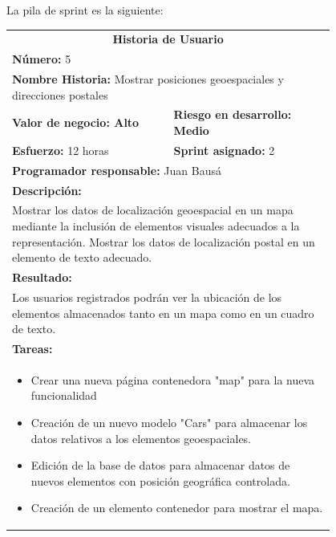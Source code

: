 	La pila de sprint es la siguiente:
	
	\begin{table}[H]
	  \centering 
	 	\begin{tabular}{p{0.4\linewidth}p{0.4\linewidth}}
	    \toprule
	    \multicolumn{2}{c}{\cellcolor{black!30}\textbf{Historia de Usuario}} 													\\
		\multicolumn{2}{l}{\cellcolor{gray!25}\textbf{Número: }5}																\\
		\multicolumn{2}{l}{\textbf{Nombre Historia: } Mostrar posiciones geoespaciales y direcciones postales}				\\
		\cellcolor{gray!25}\textbf{Valor de negocio: Alto}	&	\cellcolor{gray!25}\textbf{Riesgo en desarrollo: Medio}		\\
		\textbf{Esfuerzo:} 12 horas				&	\textbf{Sprint asignado: }2 												\\
		\multicolumn{2}{l}{\cellcolor{gray!25}\textbf{Programador responsable: }Juan Bausá}									\\
		\multicolumn{2}{l}{\textbf{Descripción:}}                                                     						\\
		\multicolumn{2}{l}{\parbox{15cm}{Mostrar los datos de localización geoespacial en un mapa mediante la inclusión de elementos visuales adecuados a la representación. Mostrar los datos de localización postal en un elemento de texto adecuado.}}				\\
		\multicolumn{2}{l}{\cellcolor{gray!25}\textbf{Resultado:}}																\\		
		\multicolumn{2}{l}{\parbox{15cm}{Los usuarios registrados podrán ver la ubicación de los elementos almacenados tanto en un mapa como en un cuadro de texto.}}																									\\
		\multicolumn{2}{l}{\textbf{Tareas:}}																					\\
		\multicolumn{2}{l}{
			\begin{minipage}{12cm}
	    		\vskip 4pt
	    		\begin{itemize}
	    			\item Crear una nueva página contenedora "map" para la nueva funcionalidad
	    			\item Creación de un nuevo modelo "Cars" para almacenar los datos relativos a los elementos geoespaciales.
	    			\item Edición de la base de datos para almacenar datos de nuevos elementos con posición geográfica controlada.
	    			\item Creación de un elemento contenedor para mostrar el mapa.

\end{itemize}
\end{minipage}}
\end{tabular}
\end{table}

